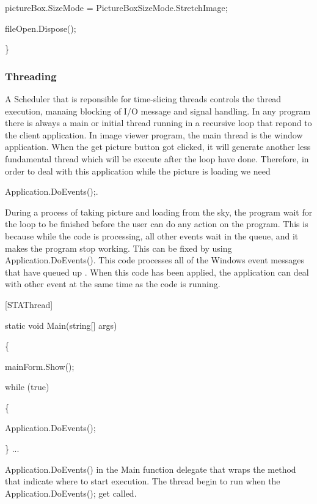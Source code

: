 \documentclass[oneside]{ecsgdp}         %
\begin{document}
       \tab      pictureBox.SizeMode = PictureBoxSizeMode.StretchImage;
       
        \tab     fileOpen.Dispose();
        
        \}
        
        
        
\subsubsection*{Threading}

A Scheduler that is reponsible for time-slicing threads controls the thread execution, manaing blocking of I/O message and signal handling\cite{keithC}. In any program there is always a main or initial thread running in a recursive loop that repond to the client application. In image viewer program, the main thread is the window application. When the get picture button got clicked, it will generate another less fundamental thread which will be execute after the loop have done. Therefore, in order to deal with this application while the picture is loading we need

Application.DoEvents();.

During a process of taking picture and loading from the sky, the program wait for the loop to be finished before the user can do any action on the program. This is because while the code is processing, all other events wait in the queue, and it makes the program stop working. This can be fixed by using Application.DoEvents(). This code processes all of the Windows event messages that have queued up \cite{davidW}. When this code has been applied, the application can deal with other event at the same time as the code is running.



        [STAThread]
        
        static void Main(string[] args)
        
        \{
        
        \tab    mainForm.Show();

        \tab    while (true)
            
         \tab   \{
            
         \tab\tab       Application.DoEvents();
                
         \tab   \}
        ...
        
        Application.DoEvents() in the Main function delegate that wraps the method that indicate where to start execution. The thread begin to run when the Application.DoEvents(); get called\cite{xieX}.
        
\end{document}
